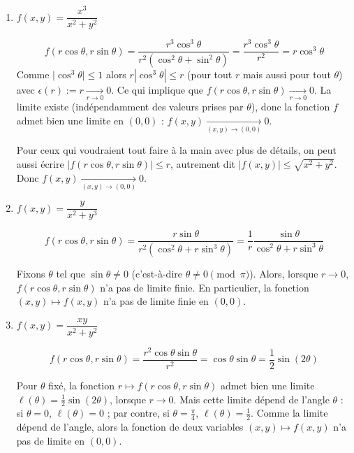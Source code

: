 \documentclass[11pt, class=report,crop=false]{standalone}
\begin{document}
\begin{exemple}
\sauteligne
\begin{enumerate}
  \item $f(x,y)=\dfrac{x^3}{x^2+y^2}$
  
  $$f(r\cos\theta,r\sin\theta) = \frac{r^3 \cos^3\theta}{r^2 (\cos^2\theta+\sin^2\theta)}
  = \frac{r^3 \cos^3\theta}{r^2} = r \cos^3 \theta$$
  Comme $\big| \cos^3 \theta \big| \le 1$ alors $r |\cos^3 \theta| \le r$ (pour tout $r$ mais aussi pour tout $\theta$) avec $\epsilon(r) := r \underset{r\to0}{\longrightarrow} 0$.  
  Ce qui implique que $f(r\cos\theta,r\sin\theta) \underset{r\to0}{\longrightarrow} 0$.
  La limite existe (indépendamment des valeurs prises par $\theta$), donc 
  la fonction $f$ admet bien une limite en $(0,0)$ : $f(x,y) \xrightarrow[(x,y) \to (0,0)]{} 0$.
  
  Pour ceux qui voudraient tout faire à la main avec plus de détails, on peut aussi écrire $\big|f(r\cos\theta,r\sin\theta)\big| \le r$, autrement dit $\big|f( x,y) \big| \le \sqrt{x^2+y^2}$. Donc $f(x,y) \xrightarrow[(x,y) \to (0,0)]{} 0$.
  
   
  \item $f(x,y)=\dfrac{y}{x^2+y^3}$
  
  
 $$f(r\cos\theta,r\sin\theta) = \frac{r\sin\theta}{r^2(\cos^2\theta + r\sin^3\theta)} = \frac{1}{r} \frac{\sin\theta}{\cos^2\theta + r\sin^3\theta}$$
 
Fixons $\theta$ tel que $\sin \theta \neq 0$ (c'est-à-dire $\theta \neq 0 \pmod \pi$). Alors, lorsque $r\to0$, $f(r\cos\theta,r\sin\theta)$ n'a pas de limite finie. En particulier, la fonction $(x,y) \mapsto f(x,y)$ n'a pas de limite finie en $(0,0)$.
 
  
  \item  $f(x,y)=\dfrac{xy}{x^2+y^2}$
  
 $$f(r\cos\theta,r\sin\theta) = \frac{r^2 \cos\theta\sin\theta}{r^2}
  = \cos\theta \sin \theta = \frac12\sin(2\theta)$$ 

Pour $\theta$ fixé, la fonction $r \mapsto f(r\cos\theta,r\sin\theta)$ admet bien une limite $\ell(\theta) = \frac12\sin(2\theta)$, lorsque $r\to0$. Mais cette limite dépend de l'angle $\theta$ :
si $\theta =0$, $\ell(\theta)=0$ ; par contre, si $\theta = \frac\pi4$, $\ell(\theta) = \frac12$. Comme la limite dépend de l'angle, alors la fonction de deux variables $(x,y) \mapsto f(x,y)$ n'a pas de limite en $(0,0)$.
\end{enumerate}
\end{exemple}
\end{document}
